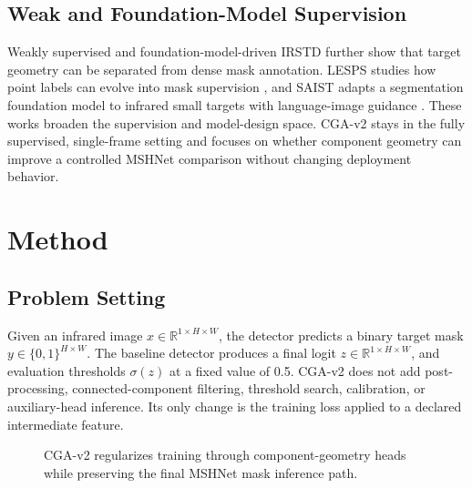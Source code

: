 \documentclass[letterpaper]{article}
\begin{document}
\subsection{Weak and Foundation-Model Supervision}

Weakly supervised and foundation-model-driven IRSTD further show that target geometry can be separated from dense mask annotation. LESPS studies how point labels can evolve into mask supervision \citep{ying2023lesps}, and SAIST adapts a segmentation foundation model to infrared small targets with language-image guidance \citep{zhang2025saist}. These works broaden the supervision and model-design space. CGA-v2 stays in the fully supervised, single-frame setting and focuses on whether component geometry can improve a controlled MSHNet comparison without changing deployment behavior.

\section{Method}

\subsection{Problem Setting}

Given an infrared image $x \in \mathbb{R}^{1 \times H \times W}$, the detector predicts a binary target mask $y \in \{0,1\}^{H \times W}$. The baseline detector produces a final logit $z \in \mathbb{R}^{1 \times H \times W}$, and evaluation thresholds $\sigma(z)$ at a fixed value of 0.5. CGA-v2 does not add post-processing, connected-component filtering, threshold search, calibration, or auxiliary-head inference. Its only change is the training loss applied to a declared intermediate feature.

\begin{figure}[t]
\centering
{}
\caption{CGA-v2 regularizes training through component-geometry heads while preserving the final MSHNet mask inference path.}
\label{fig:pipeline}
\end{figure}
\end{document}
